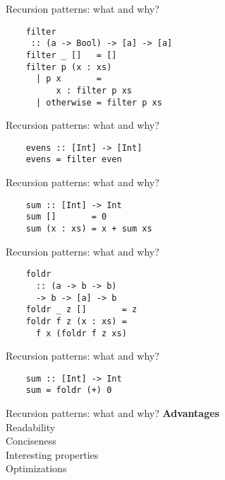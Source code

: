 \documentclass[20pt]{beamer}
\begin{document}
\begin{frame}[fragile]{Recursion patterns: what and why?}
    \begin{lstlisting}
    filter
     :: (a -> Bool) -> [a] -> [a]
    filter _ []   = []
    filter p (x : xs)
      | p x       =
          x : filter p xs
      | otherwise = filter p xs
    \end{lstlisting}
\end{frame}

\begin{frame}[fragile]{Recursion patterns: what and why?}
    \begin{lstlisting}
    evens :: [Int] -> [Int]
    evens = filter even
    \end{lstlisting}
\end{frame}

\begin{frame}[fragile]{Recursion patterns: what and why?}
    \begin{lstlisting}
    sum :: [Int] -> Int
    sum []       = 0
    sum (x : xs) = x + sum xs
    \end{lstlisting}
\end{frame}

\begin{frame}[fragile]{Recursion patterns: what and why?}
    \begin{lstlisting}
    foldr
      :: (a -> b -> b)
      -> b -> [a] -> b
    foldr _ z []       = z
    foldr f z (x : xs) =
      f x (foldr f z xs)
    \end{lstlisting}
\end{frame}

\begin{frame}[fragile]{Recursion patterns: what and why?}
    \begin{lstlisting}
    sum :: [Int] -> Int
    sum = foldr (+) 0
    \end{lstlisting}
\end{frame}

\begin{frame}{Recursion patterns: what and why?}
    \textbf{Advantages} \\
    Readability \\
    Conciseness \\
    Interesting properties \\
    Optimizations \\
\end{frame}

\end{document}
